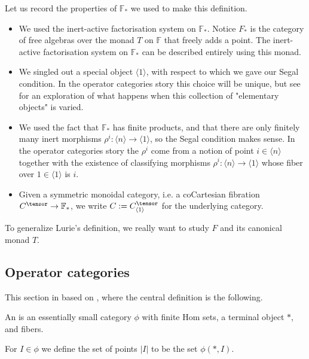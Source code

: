\begin{remark}
Let us record the properties of $\mathbb{F}_*$ we used to make this definition.
\begin{itemize}
    \item We used the inert-active factorisation system on $\mathbb{F}_*$. Notice $F_*$ is the category of free algebras over the monad $T$ on $\mathbb{F}$ that freely adds a point. The inert-active factorisation system on $\mathbb{F}_*$ can be described entirely using this monad.
    \item We singled out a special object $\langle 1 \rangle$, with respect to which we gave our Segal condition. In the operator categories story this choice will be unique, but see \cite{ChuHaugseng} for an exploration of what happens when this collection of "elementary objects" is varied.
    \item We used the fact that $\mathbb{F}_*$ has finite products, and that there are only finitely many inert morphisms $\rho^i:\langle n \rangle \rightarrow \langle 1 \rangle$, so the Segal condition makes sense. In the operator categories story the $\rho^i$ come from a notion of point $i\in\langle n \rangle$ together with the existence of classifying morphisms $\rho^i:\langle n \rangle \rightarrow \langle 1 \rangle$ whose fiber over $1\in \langle 1 \rangle$ is $i.$
    \item Given a symmetric monoidal category, i.e. a coCartesian fibration $C^\tensor\rightarrow \mathbb{F}_*$, we write $C:=C^{\tensor}_{\langle 1 \rangle}$ for the underlying category.
\end{itemize}
\end{remark}

To generalize Lurie's definition, we really want to study $F$ and its canonical monad $T.$

\subsection{Operator categories}
This section in based on \cite{Bar18}, where the central definition is the following.

\begin{definition}
    An  is an essentially small category $\phi$ with finite Hom sets, a terminal object $*$, and fibers.
\end{definition}

For $I\in\phi$ we define the set of points $|I|$ to be the set $\phi(*,I)$. 

